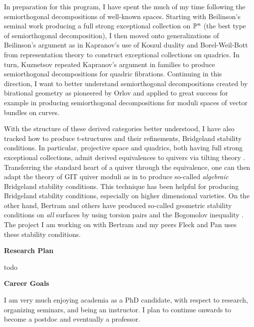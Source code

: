 \documentclass[12pt]{article}
\begin{document}
In preparation for this program, I have spent the much of my time following the semiorthogonal decompositions of well-known spaces. Starting with Beilinson's seminal work \cite{Beilinson_1978} producing a full strong exceptional collection on $\P^n$ (the best type of semiorthogonal decomposition), I then moved onto generalizations of Beilinson's argument as in Kapranov's \cite{Kapranov_1988} use of Koszul duality \cite{Beilinson_Ginzburg_Soergel_1996} and Borel-Weil-Bott from representation theory to construct exceptional collections on quadrics. In turn, Kuznetsov \cite{Kuznetsov_2005} repeated Kapranov's argument in families to produce semiorthogonal decompositions for quadric fibrations. Continuing in this direction, I want to better understand semiorthogonal decompositions created by birational geometry as pioneered by Orlov \cite{Orlov_1993} and applied to great success for example in \cite{Tevelev_Torres_2023,Tevelev_2023} producing semiorthogonal decompositions for moduli spaces of vector bundles on curves.

With the structure of these derived categories better understood, I have also tracked how to produce t-structures and their refinements, Bridgeland stability conditions. In particular, projective space and quadrics, both having full strong exceptional collections, admit derived equivalences to quivers via tilting theory \cite{Craw,King}. Transferring the standard heart of a quiver through the equivalence, one can then adapt the theory of GIT quiver moduli \cite{King_1994} as in \cite{Arcara_Bertram_Coskun_Huizenga_2012} to produce so-called \textit{algebraic} Bridgeland stability conditions. This technique has been helpful for producing Bridgeland stability conditions, especially on higher dimensional varieties. On the other hand, Bertram and others have produced so-called geometric stability conditions on \textit{all} surfaces by using torsion pairs and the Bogomolov inequality \cite{Arcara_Bertram_Lieblich_2007}. The project I am working on with Bertram and my peers Fleck and Pan uses these stability conditions.


\textbf{Research Plan}

{\color{red} todo}


\textbf{Career Goals}

I am very much enjoying academia as a PhD candidate, with respect to research, organizing seminars, and being an instructor. I plan to continue onwards to become a postdoc and eventually a professor.



\end{document}
